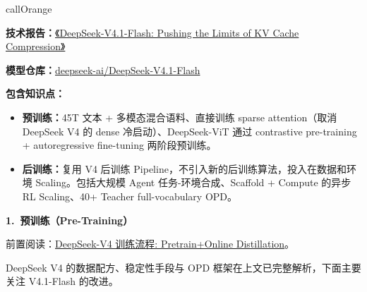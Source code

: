 \documentclass[zihao=false,fontset=windows]{ctexart}
\begin{document}
\begin{feishubox}{callOrange}{📌}

\textbf{技术报告：}\href{https://huggingface.co/deepseek-ai/DeepSeek-V4.1-Flash/blob/main/DeepSeek_V41_Tech_Report.pdf}{《DeepSeek-V4.1-Flash: Pushing the Limits of KV Cache Compression》}\par

\textbf{模型仓库：}\href{https://huggingface.co/deepseek-ai/DeepSeek-V4.1-Flash}{deepseek-ai/DeepSeek-V4.1-Flash}\par

\textbf{包含知识点：}\par
\begin{itemize}
\item 
\textbf{预训练：}45T 文本 + 多模态混合语料、直接训练 sparse attention（取消 DeepSeek V4 的 dense 冷启动）、DeepSeek-ViT 通过 contrastive pre-training + autoregressive fine-tuning 两阶段预训练。\par
\item 
\textbf{后训练：}复用 V4 后训练 Pipeline，\textcolor{feishuRed}{不引入新的后训练算法}，投入在数据和环境 Scaling。包括大规模 Agent 任务-环境合成、Scaffold + Compute 的异步 RL Scaling、40+ Teacher full-vocabulary OPD。\par
\end{itemize}
\end{feishubox}

\par{}\vspace{0.8em}\noindent \begin{tcolorbox}[boxrule=0pt,arc=3pt,colback=callRed,left=3pt,right=3pt,top=2pt,bottom=2pt,before skip=0pt,after skip=0pt]{\bfseries \textcolor{feishuBlue}{1.}\ 预训练（Pre-Training）}\end{tcolorbox}\par\vspace{0.28em}

\begin{feishuquote}

前置阅读：\href{https://my.feishu.cn/wiki/C7KRwSCpZiE7olknCUPcKGY4n5c}{DeepSeek-V4 训练流程: Pretrain+Online Distillation}。\par

DeepSeek V4 的数据配方、稳定性手段与 OPD 框架在上文已完整解析，下面主要关注 V4.1-Flash 的改进。\par
\end{feishuquote}
\end{document}
